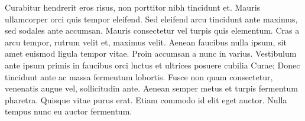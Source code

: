 Curabitur hendrerit eros risus, non porttitor nibh tincidunt et.
Mauris ullamcorper orci quis tempor eleifend.
Sed eleifend arcu tincidunt ante maximus, sed sodales ante accumsan.
Mauris consectetur vel turpis quis elementum.
Cras a arcu tempor, rutrum velit et, maximus velit.
Aenean faucibus nulla ipsum, sit amet euismod ligula tempor vitae.
Proin accumsan a nunc in varius.
Vestibulum ante ipsum primis in faucibus orci luctus et ultrices posuere cubilia Curae; Donec tincidunt ante ac massa fermentum lobortis.
Fusce non quam consectetur, venenatis augue vel, sollicitudin ante.
Aenean semper metus et turpis fermentum pharetra.
Quisque vitae purus erat.
Etiam commodo id elit eget auctor.
Nulla tempus nunc eu auctor fermentum.
